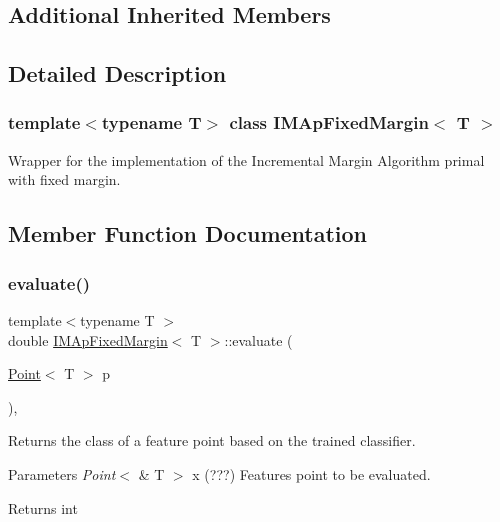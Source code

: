 \subsection*{Additional Inherited Members}


\subsection{Detailed Description}
\subsubsection*{template$<$typename T$>$\newline
class I\+M\+Ap\+Fixed\+Margin$<$ T $>$}

Wrapper for the implementation of the Incremental Margin Algorithm primal with fixed margin. 

\subsection{Member Function Documentation}
\mbox{\label{class_i_m_ap_fixed_margin_a909eb58c78c20780494598b478f8846f}} 
\subsubsection{\texorpdfstring{evaluate()}{evaluate()}}
{\footnotesize\ttfamily template$<$typename T $>$ \\
double \mbox{\hyperlink{class_i_m_ap_fixed_margin}{I\+M\+Ap\+Fixed\+Margin}}$<$ T $>$\+::evaluate (\begin{DoxyParamCaption}\item[{\mbox{\hyperlink{class_point}{Point}}$<$ T $>$}]{p }\end{DoxyParamCaption})\hspace{0.3cm}{\ttfamily [override]}, {\ttfamily [virtual]}}



Returns the class of a feature point based on the trained classifier. 


\begin{DoxyParams}{Parameters}
{\em Point$<$} & T $>$ x (???) Features point to be evaluated. \\
\hline
\end{DoxyParams}
\begin{DoxyReturn}{Returns}
int 
\end{DoxyReturn}


